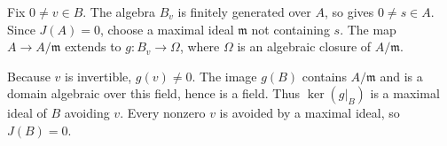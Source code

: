 Fix $0\neq v\in B$. The algebra $B_v$ is finitely generated over $A$, so  gives $0\neq s\in A$. Since $J(A)=0$, choose a maximal ideal $\mathfrak{m}$ not containing $s$. The map $A\to A/\mathfrak{m}$ extends to $g:B_v\to\Omega$, where $\Omega$ is an algebraic closure of $A/\mathfrak{m}$.

Because $v$ is invertible, $g(v)\neq0$. The image $g(B)$ contains $A/\mathfrak{m}$ and is a domain algebraic over this field, hence is a field. Thus $\ker(g|_B)$ is a maximal ideal of $B$ avoiding $v$. Every nonzero $v$ is avoided by a maximal ideal, so $J(B)=0$.
